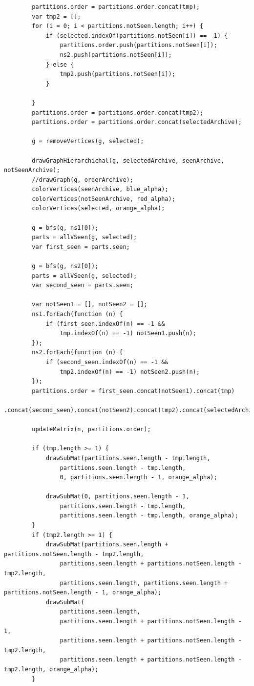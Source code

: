 \documentclass[12pt, twoside,a4paper,toc=bibliography]{scrbook}
\begin{document}
\begin{lstlisting}
        partitions.order = partitions.order.concat(tmp);
        var tmp2 = [];
        for (i = 0; i < partitions.notSeen.length; i++) {
            if (selected.indexOf(partitions.notSeen[i]) == -1) {
                partitions.order.push(partitions.notSeen[i]);
                ns2.push(partitions.notSeen[i]);
            } else {
                tmp2.push(partitions.notSeen[i]);
            }

        }
        partitions.order = partitions.order.concat(tmp2);
        partitions.order = partitions.order.concat(selectedArchive);

        g = removeVertices(g, selected);

        drawGraphHierarchichal(g, selectedArchive, seenArchive, notSeenArchive);
        //drawGraph(g, orderArchive);
        colorVertices(seenArchive, blue_alpha);
        colorVertices(notSeenArchive, red_alpha);
        colorVertices(selected, orange_alpha);

        g = bfs(g, ns1[0]);
        parts = allVSeen(g, selected);
        var first_seen = parts.seen;

        g = bfs(g, ns2[0]);
        parts = allVSeen(g, selected);
        var second_seen = parts.seen;

        var notSeen1 = [], notSeen2 = [];
        ns1.forEach(function (n) {
            if (first_seen.indexOf(n) == -1 &&
                tmp.indexOf(n) == -1) notSeen1.push(n);
        });
        ns2.forEach(function (n) {
            if (second_seen.indexOf(n) == -1 &&
                tmp2.indexOf(n) == -1) notSeen2.push(n);
        });
        partitions.order = first_seen.concat(notSeen1).concat(tmp)
            .concat(second_seen).concat(notSeen2).concat(tmp2).concat(selectedArchive);

        updateMatrix(n, partitions.order);

        if (tmp.length >= 1) {
            drawSubMat(partitions.seen.length - tmp.length,
                partitions.seen.length - tmp.length,
                0, partitions.seen.length - 1, orange_alpha);

            drawSubMat(0, partitions.seen.length - 1,
                partitions.seen.length - tmp.length,
                partitions.seen.length - tmp.length, orange_alpha);
        }
        if (tmp2.length >= 1) {
            drawSubMat(partitions.seen.length + partitions.notSeen.length - tmp2.length,
                partitions.seen.length + partitions.notSeen.length - tmp2.length,
                partitions.seen.length, partitions.seen.length + partitions.notSeen.length - 1, orange_alpha);
            drawSubMat(
                partitions.seen.length,
                partitions.seen.length + partitions.notSeen.length - 1,
                partitions.seen.length + partitions.notSeen.length - tmp2.length,
                partitions.seen.length + partitions.notSeen.length - tmp2.length, orange_alpha);
        }


\end{lstlisting}
\end{document}
